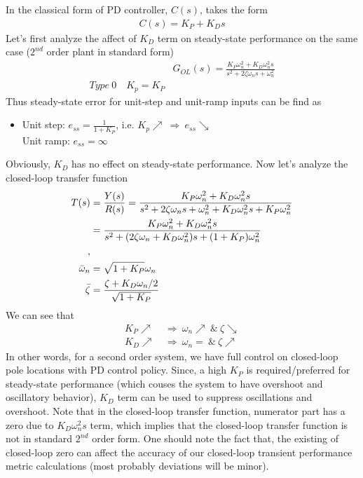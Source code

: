 \documentclass[twoside]{article}
\begin{document}
In the classical form of PD controller, $C(s)$, takes the form
%
\begin{align*}
 C(s) = K_P + K_D s
\end{align*}
%
Let's first analyze the affect of $K_D$ term on steady-state 
performance on the same case ($2^{nd}$ order plant in standard form) 
%
\begin{align*}
  &G_{OL}(s) = \frac{K_P \omega_n^2 + K_D \omega_n^2 s}{s^2 + 2 \zeta
    \omega_n s + \omega_n^2}
\\
 Type \ 0 \quad K_p = K_P
\end{align*}
% 
Thus steady-state error for unit-step and unit-ramp inputs can be find
as
\begin{itemize}
\item Unit step: $e_{ss} = \frac{1}{1 + K_P}$, i.e. $K_p \nearrow \
  \Rightarrow \ e_{ss} \searrow$  
\\ Unit ramp: $e_{ss} = \infty$
\end{itemize}
Obviously, $K_D$ has no effect on steady-state performance. Now
let's analyze the closed-loop transfer function
%
  \begin{align*}
  T(s) &= \frac{Y(s)}{R(s)} = \frac{K_P \omega_n^2 + K_D \omega_n^2 s}{s^2 + 2 \zeta
    \omega_n  s + \omega_n^2 + K_D \omega_n^2 s + K_P \omega_n^2}
\\
  &=   \frac{K_P \omega_n^2 + K_D \omega_n^2 s}{s^2 + ( 2 \zeta
    \omega_n + K_D \omega_n^2) s + (1 + K_P) \omega_n^2}
\\
,
\\
 \Bar{\omega}_n &= \sqrt{1 + K_P} \omega_n
\\
 \bar{\zeta} &= \frac{\zeta + K_D \omega_n / 2}{ \sqrt{ 1 + K_P} } 
  \end{align*}
%
We can see that
%
  \begin{align*}
    K_P \nearrow \ &\Rightarrow \ \omega_n \nearrow \ \& \ \zeta \searrow
\\
   K_D \nearrow \ &\Rightarrow \ \omega_n = \ \& \ \zeta \nearrow
  \end{align*}
%
In other words, for a second order system, we have full control on
closed-loop pole locations with PD control policy. Since, a high $K_P$
is required/preferred for steady-state performance (which couses 
the system to have overshoot and oscillatory behavior), $K_D$
term can be used to suppress oscillations and overshoot.
Note that in the closed-loop transfer function, numerator part
has a zero due to $K_D \omega_n^2 s$ term, which implies that
the closed-loop transfer function is not in standard $2^{nd}$ order
form. One should note the fact that, the existing of closed-loop
zero can affect the accuracy of our closed-loop transient performance
metric calculations (most probably deviations will be minor).
%
\end{document}
